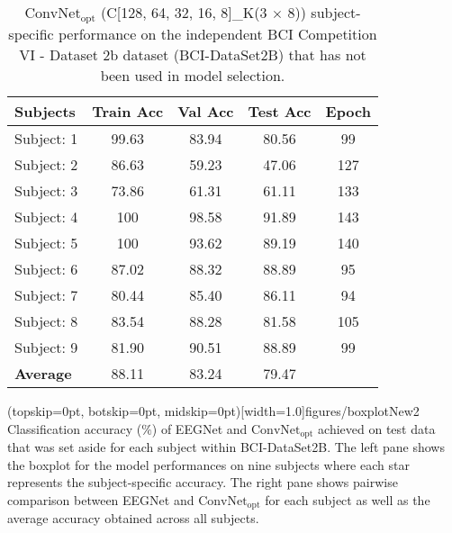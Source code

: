 \documentclass{ieeeaccess}
\newcommand{\ra}[1]{\renewcommand{\arraystretch}{#1}}
\begin{document}
{    \begin{table}[htb]  
        \centering\ra{1.1}
        \caption{$\text{ConvNet}_{\text{opt}}$ (C[128, 64, 32, 16, 8]\_K(3 $\times$ 8)) subject-specific performance on the independent BCI Competition VI - Dataset 2b dataset (BCI-DataSet2B) that has not been used in model selection.} 
        \label{ConvNetbestsubspe}
        \setlength{\tabcolsep}{10pt}
        \begin{tabular}{l|ccc|c}
            \toprule
            \textbf{Subjects} &  \textbf{Train Acc} &    \textbf{Val Acc}&   \textbf{Test Acc} &      \textbf{Epoch} \\
            \midrule
            Subject: 1 &      99.63 &      83.94 &      80.56 &      99 \\
            Subject: 2 &      86.63 &      59.23 &      47.06 &     127 \\
            Subject: 3 &      73.86 &      61.31 &      61.11 &     133 \\
            Subject: 4 &      100 &        98.58 &      91.89 &     143 \\
            Subject: 5 &      100 &        93.62 &      89.19 &     140 \\
            Subject: 6 &      87.02 &      88.32 &      88.89 &      95 \\
            Subject: 7 &      80.44 &      85.40 &      86.11 &      94 \\
            Subject: 8 &      83.54 &      88.28 &      81.58 &     105 \\
            Subject: 9 &      81.90 &      90.51 &      88.89 &      99 \\
            \midrule
            \textbf{Average}    &      88.11 &      83.24 &      79.47 &      ~ \\
            \bottomrule
        \end{tabular}
        \label{CONVT}
    \end{table}
    

\Figure[t!](topskip=0pt, botskip=0pt, midskip=0pt)[width=1.0\linewidth]{figures/boxplotNew2}
{Classification accuracy ($\%$) of EEGNet and $\text{ConvNet}_{\text{opt}}$ achieved on test data that was set aside for each subject within BCI-DataSet2B. The left pane shows the boxplot for the model performances on nine subjects where each star represents the subject-specific accuracy. The right pane shows pairwise comparison between EEGNet and $\text{ConvNet}_{\text{opt}}$ for each subject as well as the average accuracy obtained across all subjects. \label{fig:ConvNet_vs_EEGNet}}

}
\end{document}
